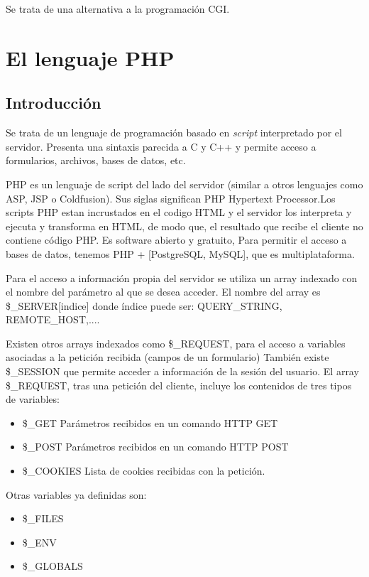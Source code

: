 \documentclass{apuntes}
\begin{document}
Se trata de una alternativa a la programación CGI.

\section{El lenguaje PHP}
\subsection{Introducción}
Se trata de un lenguaje de programación basado en \emph{script} interpretado por el servidor. Presenta una sintaxis parecida a C y C++ y permite acceso a formularios, archivos, bases de datos, etc.

PHP es un lenguaje de script del lado del servidor (similar a otros lenguajes como ASP, JSP o Coldfusion). Sus siglas significan PHP Hypertext Processor.Los scripts PHP estan incrustados en el codigo HTML y el servidor los interpreta y ejecuta y transforma en HTML,  de modo que, el resultado que recibe el cliente no contiene código PHP. Es software abierto y gratuito, Para permitir el acceso a bases de datos, tenemos PHP + [PostgreSQL, MySQL], que es multiplataforma.


Para el acceso a información propia del servidor se utiliza un  array indexado con el nombre del parámetro al que se desea acceder. El nombre del array es \$\_SERVER[indice] donde índice puede ser: QUERY\_STRING, REMOTE\_HOST,....

Existen otros arrays indexados como \$\_REQUEST, para el acceso a variables asociadas a la petición recibida (campos de un formulario)
También existe \$\_SESSION que permite acceder a información de la sesión del usuario. El array \$\_REQUEST, tras una petición del cliente, incluye los contenidos de tres tipos de variables:
\begin{itemize}
\item \$\_GET Parámetros recibidos en un comando HTTP GET
\item \$\_POST Parámetros recibidos en un comando HTTP POST
\item \$\_COOKIES Lista de cookies recibidas con la petición.
\end{itemize}

Otras variables ya definidas son:
\begin{itemize}
\item\$\_FILES
\item\$\_ENV
\item\$\_GLOBALS
\end{itemize}
\end{document}
